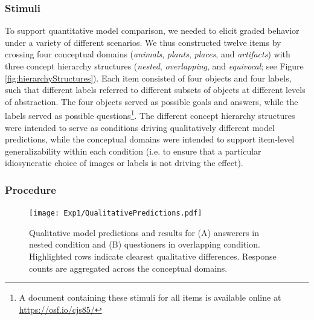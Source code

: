 \documentclass[11pt, floatsintext]{apa6}
\begin{document}
\subsubsection{Stimuli} 

To support quantitative model comparison, we needed to elicit graded behavior under a variety of different scenarios.
We thus constructed twelve items by crossing four conceptual domains (\emph{animals}, \emph{plants}, \emph{places}, and \emph{artifacts}) with three concept hierarchy structures (\emph{nested}, \emph{overlapping}, and \emph{equivocal}; see Figure \ref{fig:hierarchyStructures}).
Each item consisted of four objects and four labels, such that different labels referred to different subsets of objects at different levels of abstraction. 
The four objects served as possible goals and answers, while the labels served as possible questions\footnote{A document containing these stimuli for all items is available online at \scriptsize\url{https://osf.io/cjs85/}}.
The different concept hierarchy structures were intended to serve as conditions driving qualitatively different model predictions, while the conceptual domains were intended to support item-level generalizability within each condition (i.e. to ensure that a particular idiosyncratic choice of images or labels is not driving the effect).


\subsubsection{Procedure}

\begin{figure}[h]
\begin{center}
\texttt{[image: Exp1/QualitativePredictions.pdf]}
\end{center}
\caption{\footnotesize  Qualitative model predictions and results for (A) answerers in nested condition and (B) questioners in overlapping condition. Highlighted rows indicate clearest qualitative differences. Response counts are aggregated across the conceptual domains.}
\label{fig:exp1qualitative}
\end{figure}
\end{document}
